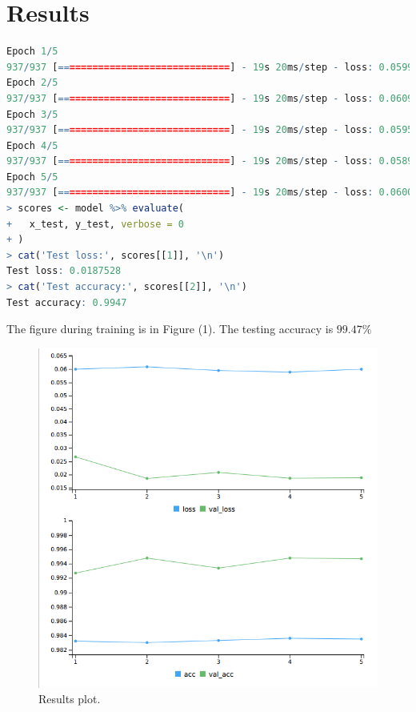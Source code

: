 \documentclass[12pt]{article}
\begin{document}
\section{Results}
\begin{lstlisting}[language=R,breaklines=true]
Epoch 1/5
937/937 [==============================] - 19s 20ms/step - loss: 0.0599 - acc: 0.9832 - val_loss: 0.0267 - val_acc: 0.9927
Epoch 2/5
937/937 [==============================] - 19s 20ms/step - loss: 0.0609 - acc: 0.9830 - val_loss: 0.0185 - val_acc: 0.9948
Epoch 3/5
937/937 [==============================] - 19s 20ms/step - loss: 0.0595 - acc: 0.9832 - val_loss: 0.0208 - val_acc: 0.9934
Epoch 4/5
937/937 [==============================] - 19s 20ms/step - loss: 0.0589 - acc: 0.9836 - val_loss: 0.0186 - val_acc: 0.9948
Epoch 5/5
937/937 [==============================] - 19s 20ms/step - loss: 0.0600 - acc: 0.9835 - val_loss: 0.0188 - val_acc: 0.9947
> scores <- model %>% evaluate(
+   x_test, y_test, verbose = 0
+ )
> cat('Test loss:', scores[[1]], '\n')
Test loss: 0.0187528 
> cat('Test accuracy:', scores[[2]], '\n')
Test accuracy: 0.9947 
\end{lstlisting}
The figure during training is in Figure (1). The testing accuracy is $99.47\%$
\begin{figure}
	\centering
	\includegraphics[scale=1]{lines.png}
	\caption{Results plot.}
\end{figure}
\end{document}
